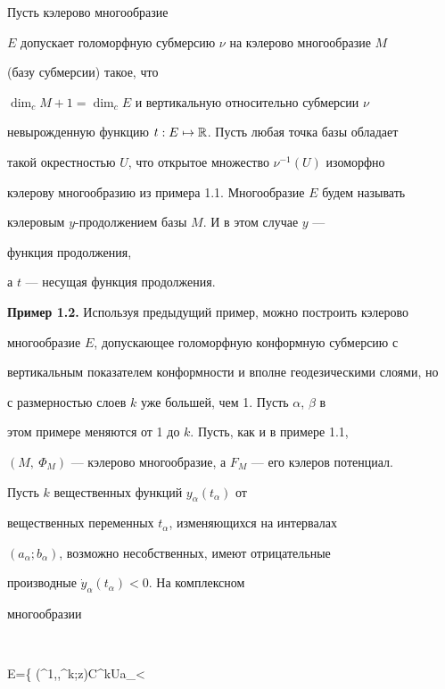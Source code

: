 \begin{defns}\label{df1.3}


Пусть кэлерово многообразие


$E$ допускает голоморфную субмерсию $\nu$ на кэлерово многообразие $M$


(базу субмерсии) такое, что


$\dim_cM+1=\dim_cE$ и вертикальную относительно субмерсии $\nu$


невырожденную функцию $t:E\mapsto \Bbb R$. Пусть любая точка базы обладает


такой окрестностью $U$, что открытое множество $\nu^{-1}(U)$ изоморфно


кэлерову многообразию из примера 1.1. Многообразие $E$ будем называть


кэлеровым $y$-продолжением базы $M$. И в этом случае $y$ ---


функция продолжения,


а $t$ --- несущая функция продолжения.


\end{defns}





{\bf Пример 1.2.} Используя предыдущий пример, можно построить кэлерово


многообразие $E$, допускающее голоморфную конформную субмерсию с


вертикальным показателем конформности и вполне геодезическими слоями, но


с размерностью слоев $k$ уже большей, чем 1. Пусть $\alpha$, $\beta$ в


этом примере меняются от 1 до $k$. Пусть, как и в примере 1.1,


$(M,\ \Phi_M)$ --- кэлерово многообразие, а $F_M$ --- его кэлеров потенциал.


Пусть $k$ вещественных функций $y_{\alpha }(t_{\alpha })$ от


вещественных переменных $t_{\alpha }$, изменяющихся на интервалах


$(a_{\alpha };b_{\alpha })$, возможно несобственных, имеют отрицательные


производные $\Dot y_{\alpha }(t_{\alpha })<0$. На комплексном


многообразии




$$


E=\{ (\zeta^1,\dotsc ,\zeta^k;z)\in \Bbb C^k\times U\mid a_{\alpha }<


